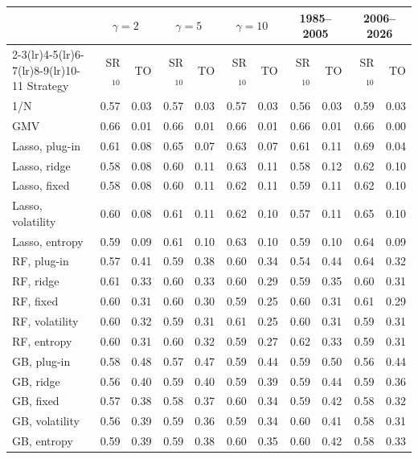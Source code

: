 \begin{tabular}{lrrrrrrrrrr}
\toprule
 & \multicolumn{2}{c}{$\gamma=2$} & \multicolumn{2}{c}{$\gamma=5$} & \multicolumn{2}{c}{$\gamma=10$} & \multicolumn{2}{c}{1985--2005} & \multicolumn{2}{c}{2006--2026} \\
\cmidrule(lr){2-3}\cmidrule(lr){4-5}\cmidrule(lr){6-7}\cmidrule(lr){8-9}\cmidrule(lr){10-11}
Strategy & SR$_{10}$ & TO & SR$_{10}$ & TO & SR$_{10}$ & TO & SR$_{10}$ & TO & SR$_{10}$ & TO \\
\midrule
1/N & 0.57 & 0.03 & 0.57 & 0.03 & 0.57 & 0.03 & 0.56 & 0.03 & 0.59 & 0.03 \\
GMV & 0.66 & 0.01 & 0.66 & 0.01 & 0.66 & 0.01 & 0.66 & 0.01 & 0.66 & 0.00 \\
\midrule
Lasso, plug-in & 0.61 & 0.08 & 0.65 & 0.07 & 0.63 & 0.07 & 0.61 & 0.11 & 0.69 & 0.04 \\
Lasso, ridge & 0.58 & 0.08 & 0.60 & 0.11 & 0.63 & 0.11 & 0.58 & 0.12 & 0.62 & 0.10 \\
Lasso, fixed & 0.58 & 0.08 & 0.60 & 0.11 & 0.62 & 0.11 & 0.59 & 0.11 & 0.62 & 0.10 \\
Lasso, volatility & 0.60 & 0.08 & 0.61 & 0.11 & 0.62 & 0.10 & 0.57 & 0.11 & 0.65 & 0.10 \\
Lasso, entropy & 0.59 & 0.09 & 0.61 & 0.10 & 0.63 & 0.10 & 0.59 & 0.10 & 0.64 & 0.09 \\
\midrule
RF, plug-in & 0.57 & 0.41 & 0.59 & 0.38 & 0.60 & 0.34 & 0.54 & 0.44 & 0.64 & 0.32 \\
RF, ridge & 0.61 & 0.33 & 0.60 & 0.33 & 0.60 & 0.29 & 0.59 & 0.35 & 0.60 & 0.31 \\
RF, fixed & 0.60 & 0.31 & 0.60 & 0.30 & 0.59 & 0.25 & 0.60 & 0.31 & 0.61 & 0.29 \\
RF, volatility & 0.60 & 0.32 & 0.59 & 0.31 & 0.61 & 0.25 & 0.60 & 0.31 & 0.59 & 0.31 \\
RF, entropy & 0.60 & 0.31 & 0.60 & 0.32 & 0.59 & 0.27 & 0.62 & 0.33 & 0.59 & 0.31 \\
\midrule
GB, plug-in & 0.58 & 0.48 & 0.57 & 0.47 & 0.59 & 0.44 & 0.59 & 0.50 & 0.56 & 0.44 \\
GB, ridge & 0.56 & 0.40 & 0.59 & 0.40 & 0.59 & 0.39 & 0.59 & 0.44 & 0.59 & 0.36 \\
GB, fixed & 0.57 & 0.38 & 0.58 & 0.37 & 0.60 & 0.34 & 0.59 & 0.42 & 0.58 & 0.32 \\
GB, volatility & 0.56 & 0.39 & 0.59 & 0.36 & 0.59 & 0.34 & 0.60 & 0.41 & 0.58 & 0.31 \\
GB, entropy & 0.59 & 0.39 & 0.59 & 0.38 & 0.60 & 0.35 & 0.60 & 0.42 & 0.58 & 0.33 \\
\bottomrule
\end{tabular}